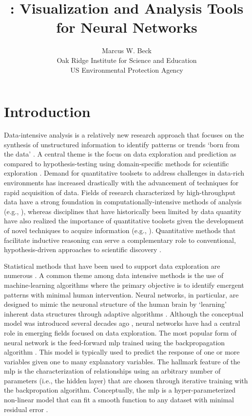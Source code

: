 \documentclass[article,shortnames]{jss}\usepackage[]{graphicx}\usepackage[]{color}
\author{Marcus W. Beck\\Oak Ridge Institute for Science and Education\\US Environmental Protection Agency}
\title{\pkg{NeuralNetTools}: Visualization and Analysis Tools for Neural Networks}
\begin{document}

\section[Introduction]{Introduction}

Data-intensive analysis is a relatively new research approach that focuses on the synthesis of unstructured information to identify patterns or trends `born from the data' \citep{Kelling09}.  A central theme is the focus on data exploration and prediction as compared to hypothesis-testing using domain-specific methods for scientific exploration \citep{Kell03}.  Demand for quantitative toolsets to address challenges in data-rich environments has increased drastically with the advancement of techniques for rapid acquisition of data. Fields of research characterized by high-throughput data have a strong foundation in computationally-intensive methods of analysis (e.g., \citet{Saeys07}), whereas disciplines that have historically been limited by data quantity have also realized the importance of quantitative toolsets given the development of novel techniques to acquire information (e.g., \citet{Swanson15}).  Quantitative methods that facilitate inductive reasoning can serve a complementary role to conventional, hypothesis-driven approaches to scientific discovery \citep{Kell03}.  

Statistical methods that have been used to support data exploration are numerous \citep{Jain00}.  A common theme among data intensive methods is the use of machine-learning algorithms where the primary objective is to identify emergent patterns with minimal human intervention.  Neural networks, in particular, are designed to mimic the neuronal structure of the human brain by `learning' inherent data structures through adaptive algorithms \citep{Rumelhart86,Ripley96}.  Although the conceptual model was introduced several decades ago \citep{McCulloch43}, neural networks have had a central role in emerging fields focused on data exploration.  The most popular form of neural network is the feed-forward \ac{mlp} trained using the backpropagation algorithm \citep{Rumelhart86}.  This model is typically used to predict the response of one or more variables given one to many explanatory variables.  The hallmark feature of the \ac{mlp} is the characterization of relationships using an arbitrary number of parameters (i.e., the hidden layer) that are chosen through iterative training with the backpropation algorithm.  Conceptually, the \ac{mlp} is a hyper-parameterized non-linear model that can fit a smooth function to any dataset with minimal residual error \citep{Hornik91}.
\end{document}
